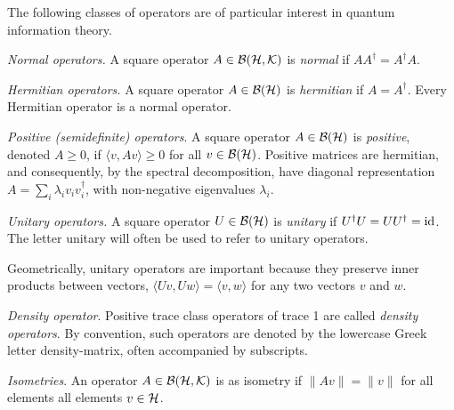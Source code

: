 The following classes of operators are of particular interest in quantum information theory.

\begin{definition}
  \emph{Normal operators.} A square operator $A \in \mathcal{B}(\mathcal{H},\mathcal{K})$ is \emph{normal} if $AA^{\dagger} = A^{\dagger}A$.
\end{definition}

\begin{definition} \label{def:hermitian}
  \emph{Hermitian operators.} A square operator $A \in \mathcal{B}(\mathcal{H})$ is \emph{hermitian}  if $A = A^{\dagger}$. Every Hermitian operator is a normal operator.
\end {definition}

\begin{definition} \label{def:positive}
  \emph{Positive (semidefinite) operators}. A square operator $A\in \mathcal{B}(\mathcal{H})$ is \emph{positive}, denoted $A \geq 0$, if $\langle v, Av \rangle \geq 0$ for all $v \in  \mathcal{B}(\mathcal{H})$.   Positive matrices are hermitian, and consequently, by the spectral decomposition, have diagonal representation $A =  \sum_i \lambda_i v_i v_i^{\dag}$, with non-negative eigenvalues $\lambda_i$. 

\end{definition}

\begin{definition}
  \emph{Unitary operators.} A square operator $U \in  \mathcal{B}(\mathcal{H})$ is \emph{unitary} if $U^{\dagger}U = UU^{\dagger} = \mathrm{id}$. The letter \gls{unitary} will often be used to refer to unitary
  operators.
\end{definition}
Geometrically, unitary operators are important because they preserve inner products between vectors, $\langle U v, U w \rangle = \langle v, w \rangle$  for any two vectors $v$ and $w$. 

\begin{definition}
  \emph{Density operator}. Positive  trace class operators of trace 1 are called \emph{density operators}.  By convention, such operators are denoted by the lowercase Greek letter \gls{density-matrix}, often accompanied by subscripts.
\end{definition}

\begin{definition}
  \emph{Isometries}. An operator $A \in \mathcal{B}(\mathcal{H},\mathcal{K} )$ is as isometry if $\|Av\| = \|v\|$ for all elements all elements $v \in \mathcal{H} $.
\end{definition}

